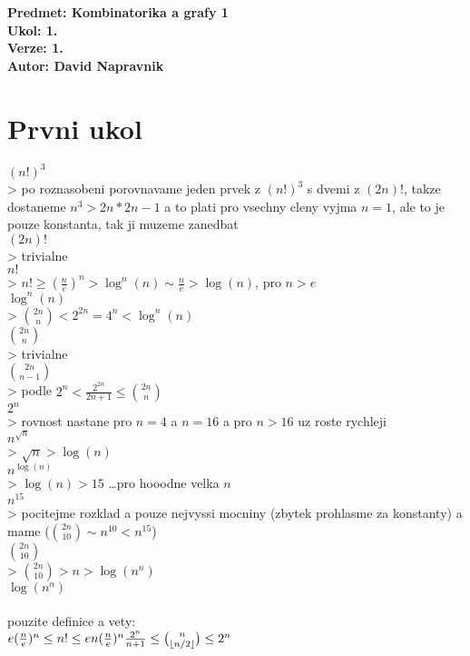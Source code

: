 \documentclass[a4paper]{article}
\begin{document}
\noindent
\textbf{Predmet: Kombinatorika a grafy 1}\\
\textbf{Ukol: 1.}\\
\textbf{Verze: 1.}\\
\textbf{Autor: David Napravnik}

\section*{Prvni ukol}

$(n!)^3$ \\ >
po roznasobeni porovnavame jeden prvek z $(n!)^3$ s dvemi z $(2n)!$, takze dostaneme $n^3 > 2n*2n-1$ a to plati pro vsechny cleny vyjma $n=1$, ale to je pouze konstanta, tak ji muzeme zanedbat
\\$(2n)!$ \\ >
trivialne
\\$n!$ \\ >
$n! \geq (\frac{n}{e})^n > \log^n(n) \sim \frac{n}{e} > \log(n)$, pro $n>e$
\\$\log^n(n)$ \\ >
$\binom{2n}{n} < 2^{2n} = 4^n < \log^n(n)$
\\$\binom{2n}{n}$ \\ >
trivialne
\\$\binom{2n}{n-1}$ \\ >
podle $2^n < \frac{2^{2n}}{2n+1}\leq \binom{2n}{n}$
\\$2^n$ \\ >
rovnost nastane pro $n=4$ a $n=16$ a pro $n>16$ uz roste rychleji
\\$n^{\sqrt{n}}$ \\ >
$\sqrt{n} > \log(n)$
\\$n^{\log(n)}$ \\ >
$\log(n) > 15$ \dots pro hooodne velka $n$
\\$n^{15}$ \\ >
pocitejme rozklad a pouze nejvyssi mocniny (zbytek prohlasme za konstanty) a mame ($ \binom{2n}{10}\sim n^{10} < n^{15}$)
\\$\binom{2n}{10}$ \\ >
$\binom{2n}{10} > n > \log(n^n)$
\\$\log(n^n)$ \\\\
pouzite definice a vety:\\
$
e(\frac{n}{e})^n \leq n! \leq en(\frac{n}{e})^n  \\
\frac{2^n}{n+1}\leq \binom{n}{\lfloor n/2 \rfloor} \leq 2^n
$
\end{document}
